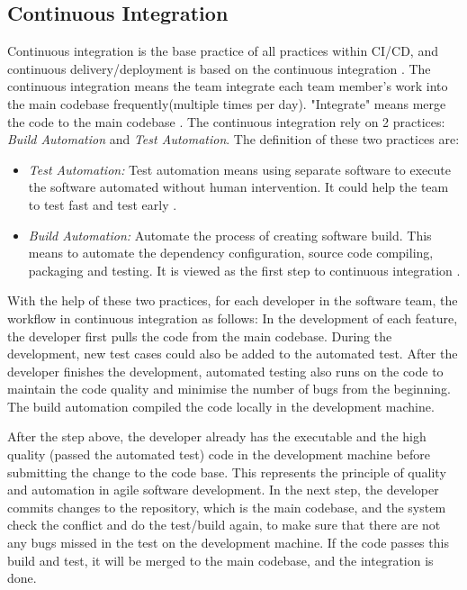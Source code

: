 \subsection{Continuous Integration}
Continuous integration is the base practice of all practices within CI/CD, and continuous delivery/deployment is based on the continuous integration \cite{pittet2018continuous}.
The continuous integration means the team integrate each team member's work into the main codebase frequently(multiple times per day). "Integrate" means merge the code to the main codebase \cite{fowler2006continuous}. The continuous integration rely on 2 practices: \textit{Build Automation} and \textit{Test Automation}. The definition of these two practices are:
\begin{itemize}
    \label{TestA}
    \item \textit{Test Automation:} Test automation means using separate software to execute the software automated without human intervention. It could help the team to test fast and test early \cite{Testauto48:online}. 
    \item \textit{Build Automation:} Automate the process of creating software build. This means to automate the dependency configuration, source code compiling, packaging and testing. It is viewed as the first step to continuous integration \cite{Buildaut62:online}.
\end{itemize}
With the help of these two practices, for each developer in the software team, the workflow \cite{fowler2006continuous} in continuous integration as follows: In the development of each feature, the developer first pulls the code from the main codebase. During the development, new test cases could also be added to the automated test. After the developer finishes the development, automated testing also runs on the code to maintain the code quality and minimise the number of bugs from the beginning. The build automation compiled the code locally in the development machine. 
\par
After the step above, the developer already has the executable and the high quality (passed the automated test) code in the development machine before submitting the change to the code base. This represents the principle of quality and automation in agile software development. In the next step, the developer commits changes to the repository, which is the main codebase, and the system check the conflict and do the test/build again, to make sure that there are not any bugs missed in the test on the development machine.
If the code passes this build and test, it will be merged to the main codebase, and the integration is done.
